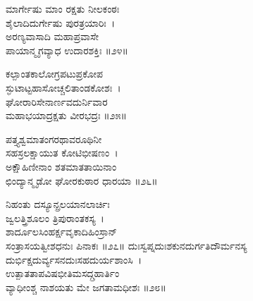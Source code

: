 ಮಾರ್ಗೇಷು ಮಾಂ ರಕ್ಷತು ನೀಲಕಂಠಃ\\ಶೈಲಾದಿದುರ್ಗೇಷು ಪುರತ್ರಯಾರಿಃ~।\\
ಅರಣ್ಯವಾಸಾದಿ ಮಹಾಪ್ರವಾಸೇ\\ಪಾಯಾನ್ಮೃಗವ್ಯಾಧ ಉದಾರಶಕ್ತಿಃ ॥೨೪॥

ಕಲ್ಪಾಂತಕಾಲೋಗ್ರಪಟುಪ್ರಕೋಪ\\ಸ್ಫುಟಾಟ್ಟಹಾಸೋಚ್ಚಲಿತಾಂಡಕೋಶಃ~।\\
ಘೋರಾರಿಸೇನಾರ್ಣವದುರ್ನಿವಾರ\\ಮಹಾಭಯಾದ್ರಕ್ಷತು ವೀರಭದ್ರಃ ॥೨೫॥

ಪತ್ತ್ಯಶ್ವಮಾತಂಗರಥಾವರೂಥಿನೀ\\ಸಹಸ್ರಲಕ್ಷಾಯುತ ಕೋಟಿಭೀಷಣಂ~।\\
ಅಕ್ಷೌಹಿಣೀನಾಂ ಶತಮಾತತಾಯಿನಾಂ\\ಛಿಂದ್ಯಾನ್ಮೃಡೋ ಘೋರಕುಠಾರ ಧಾರಯಾ ॥೨೬॥

ನಿಹಂತು ದಸ್ಯೂನ್ಪ್ರಲಯಾನಲಾರ್ಚಿಃ\\ಜ್ವಲತ್ತ್ರಿಶೂಲಂ ತ್ರಿಪುರಾಂತಕಸ್ಯ~।\\
ಶಾರ್ದೂಲಸಿಂಹರ್ಕ್ಷವೃಕಾದಿಹಿಂಸ್ರಾನ್\\ಸಂತ್ರಾಸಯತ್ವೀಶಧನುಃ ಪಿನಾಕಃ ॥೨೭॥
\newpage
ದುಃಸ್ವಪ್ನದುಃಶಕುನದುರ್ಗತಿದೌರ್ಮನಸ್ಯ\\ದುರ್ಭಿಕ್ಷದುರ್ವ್ಯಸನದುಃಸಹದುರ್ಯಶಾಂಸಿ~।\\
ಉತ್ಪಾತತಾಪವಿಷಭೀತಿಮಸದ್ಗ್ರಹಾರ್ತಿಂ\\ವ್ಯಾಧೀಂಶ್ಚ ನಾಶಯತು ಮೇ ಜಗತಾಮಧೀಶಃ ॥೨೮॥

